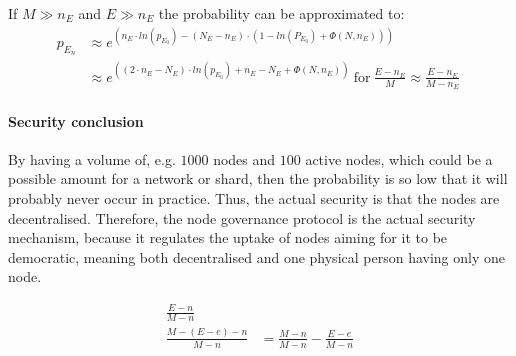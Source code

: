 If $M \gg n_E$ and $E \gg n_E$ the probability can be approximated to:
\begin{align*}
 p_{E_n} & \approx e^{(n_E \cdot ln(p_{E_0})-(N_E-n_E) \cdot (1-ln(P_{E_0})+\Phi(N,n_E)))} \\ 
         &\approx e^{((2 \cdot n_E - N_E) \cdot ln(p_{E_0}) + n_E - N_E + \Phi(N,n_E))} ~ 
 \text{for} ~ \frac{E-n_E}{M} \approx \frac{E-n_E}{M-n_E}
\
\end{align*}

\paragraph{Security conclusion\\}
By having a volume of, e.g. $1000$ nodes and $100$ active nodes, which could be a possible amount for a network or shard, then the probability is so low that it will probably never occur in practice. Thus, the actual security is that the nodes are decentralised. Therefore, the node governance protocol is the actual security mechanism, because it regulates the uptake of nodes aiming for it to be democratic, meaning both decentralised and one physical person having only one node.  

\begin{align}
\frac{E-n}{M-n}\\
\frac{M-(E-e)-n}{M-n} &= \frac{M-n}{M-n} - \frac{E-e}{M-n}
\end{align}